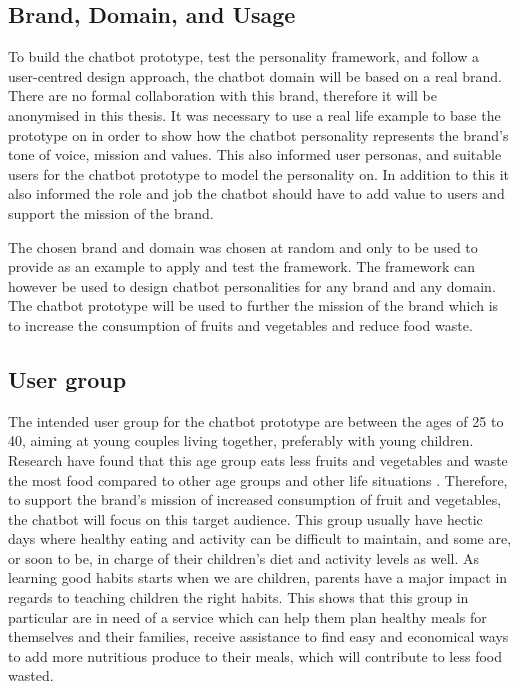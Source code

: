 \vspace{5mm} %

\subsection{Brand, Domain, and Usage}

To build the chatbot prototype, test the personality framework, and follow a user-centred design approach, the chatbot domain will be based on a real brand. There are no formal collaboration with this brand, therefore it will be anonymised in this thesis. It was necessary to use a real life example to base the prototype on in order to show how the chatbot personality represents the brand's tone of voice, mission and values. This also informed user personas, and suitable users for the chatbot prototype to model the personality on. In addition to this it also informed the role and job the chatbot should have to add value to users and support the mission of the brand.

The chosen brand and domain was chosen at random and only to be used to provide as an example to apply and test the framework. The framework can however be used to design chatbot personalities for any brand and any domain. The chatbot prototype will be used to further the mission of the brand which is to increase the consumption of fruits and vegetables and reduce food waste. 

\subsection{User group}

The intended user group for the chatbot prototype are between the ages of 25 to 40, aiming at young couples living together, preferably with young children. Research have found that this age group eats less fruits and vegetables and waste the most food compared to other age groups and other life situations \citep{forskning2011}. Therefore, to support the brand's mission of increased consumption of fruit and vegetables, the chatbot will focus on this target audience. This group usually have hectic days where healthy eating and activity can be difficult to maintain, and some are, or soon to be, in charge of their children’s diet and activity levels as well. As learning good habits starts when we are children, parents have a major impact in regards to teaching children the right habits. This shows that this group in particular are in need of a service which can help them plan healthy meals for themselves and their families, receive assistance to find easy and economical ways to add more nutritious produce to their meals, which will contribute to less food wasted.

